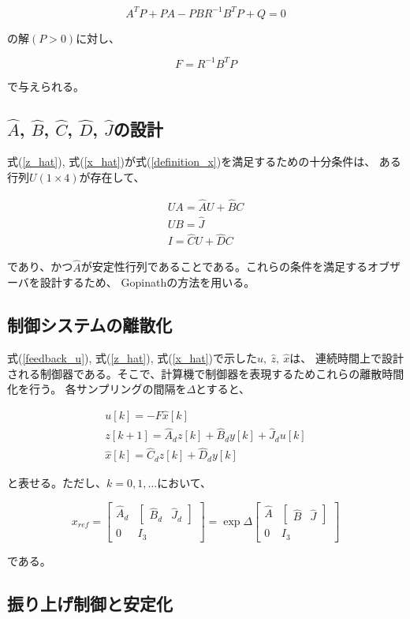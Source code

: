 $$
    A^{T}P + PA - PBR^{-1}B^{T}P + Q = 0
$$

の解$(P > 0)$に対し、

$$
    F = R^{-1}B^{T}P
$$

で与えられる。

\subsection{$\hat{A}$, $\hat{B}$, $\hat{C}$, $\hat{D}$, $\hat{J}$の設計}
式(\ref{z_hat}), 式(\ref{x_hat})が式(\ref{definition_x})を満足するための十分条件は、
ある行列$U(1 \times 4)$が存在して、

$$
    \begin{array}{c}
        UA = \hat{A}U + \hat{B}C \\
        UB = \hat{J} \\
        I = \hat{C}U + \hat{D}C
    \end{array}
$$

であり、かつ$\hat{A}$が安定性行列であることである。これらの条件を満足するオブザーバを設計するため、
Gopinathの方法を用いる。

\subsection{制御システムの離散化}
式(\ref{feedback_u}), 式(\ref{z_hat}), 式(\ref{x_hat})で示した$u,\ \hat{z},\ \hat{x}$は、
連続時間上で設計される制御器である。そこで、計算機で制御器を表現するためこれらの離散時間化を行う。
各サンプリングの間隔を$\Delta$とすると、

$$
    \begin{array}{c}
        u[k] = -F \hat{x}[k] \\
        z[k + 1] = \hat{A}_{d}z[k] + \hat{B}_{d}y[k] + \hat{J}_{d}u[k] \\
        \hat{x}[k] = \hat{C}_{d}z[k] + \hat{D}_{d}y[k]
    \end{array}
$$

と表せる。ただし、$k = 0, 1, \dots$において、

$$
    x_{ref} = 
    \left[
        \begin{array}{cc}
            \hat{A}_{d}  &  \left[
                                \begin{array}{cc}
                                    \hat{B}_{d}  &  \hat{J}_{d}
                                \end{array}
                            \right] \\
            0            &  I_{3}
        \end{array}
    \right]
    =
    \exp \Delta
    \left[
        \begin{array}{cc}
            \hat{A}  &  \left[
                            \begin{array}{cc}
                                \hat{B}  &  \hat{J}
                            \end{array}
                        \right] \\
            0        &  I_{3}
        \end{array}
    \right]
$$

である。

\subsection{振り上げ制御と安定化}



